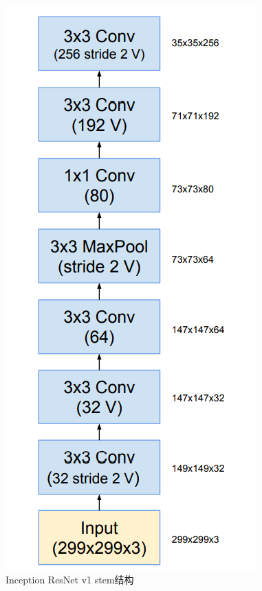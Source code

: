 \begin{figure}[htbp]
	\centering
	\includegraphics[width=0.7\linewidth]{readings_figures/Inception_ResNet_v1_stem.png}
	\caption{Inception ResNet v1 stem结构}
	\label{fig:Inception_ResNet_v1_stem}
\end{figure}

